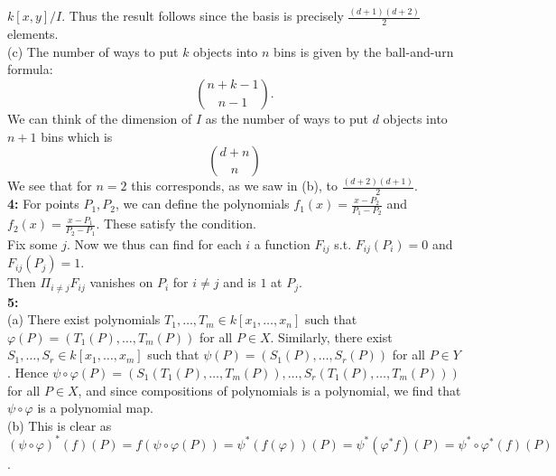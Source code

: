\documentclass[a4paper]{article}
\begin{document}
     $k\left[ x,y \right] / I$. Thus the result follows since
     the basis is precisely
     $\frac{(d+1) (d+2)}{2}$ elements.\\
     \linebreak
     (c) The number of ways to put $k$ objects into $n$ bins is 
     given by the ball-and-urn formula:
     \[
         \binom{n+k-1}{n-1}.
     \] 
     We can think of the dimension of $I$ as the number of ways to put
     $d$ objects into $n+1$ bins which is
     \[
         \binom{d+n}{n}
     \] 
     We see that for $n = 2$ this corresponds, as we saw in (b), to
     $\frac{(d+2)(d+1)}{2}$.\\
     \linebreak
     \textbf{4:} 
     For points $P_1, P_2$, we can define the polynomials
     $f_1(x) = \frac{x-P_2}{P_1 - P_2}$ and
     $f_2 (x) = \frac{x - P_1}{P_2 - P_1}$. These satisfy the condition.\\
     Fix some $j$.
     Now we thus can find for each $i$ a function $F_{ij}$ s.t. 
     $F_{ij}(P_i) = 0$ and $F_{ij}(P_j) = 1$.\\
     Then $\Pi_{i \neq j} F_{ij}$ vanishes on $P_i$ for $i\neq j$ and
     is $1$ at $P_j$.\\
     \linebreak
     \textbf{5:}\\
     (a) There exist polynomials
     $T_1, \ldots, T_m \in k\left[ x_1, \ldots, x_n \right] $ such that
     $\varphi (P) = \left( T_1(P), \ldots, T_m(P) \right) $ for
     all $P \in X$. Similarly, there exist $S_1, \ldots, S_r \in k\left[ x_1,
     \ldots, x_m \right] $ such that
     $\psi (P) = \left( S_1 (P), \ldots, S_r(P) \right) $ for all
     $P \in Y$. Hence
     $\psi \circ \varphi (P) = 
     \left( S_1 \left( T_1 (P), \ldots, T_m(P) \right) ,
     \ldots, 
 S_r \left( T_1 (P), \ldots, T_m(P) \right) \right) $ for all $P \in X$, and
 since compositions of polynomials is a polynomial, we find that
 $\psi \circ \varphi$ is a polynomial map.\\
 \linebreak
 (b) This is clear as
 $\left( \psi \circ \varphi \right)^{*}(f) (P)
 = f\left( \psi \circ \varphi(P) \right) 
 = \psi^{*} \left( f \left( \varphi \right)  \right) (P)
 = \psi^{*} \left( \varphi^{*} f \right) (P)
 = \psi^{*} \circ \varphi^{*} (f) (P)$.

     


      
     

 
\end{document}
